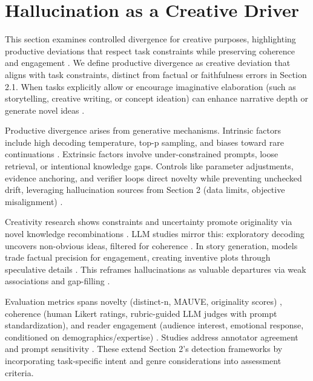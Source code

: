 \documentclass{llncs}
\begin{document}
\section{Hallucination as a Creative Driver}

This section examines controlled divergence for creative purposes, highlighting productive deviations that respect task constraints while preserving coherence and engagement \cite{wu2024writingbench,sun2024hallucinating}.
We define productive divergence as creative deviation that aligns with task constraints, distinct from factual or faithfulness errors in Section 2.1. When tasks explicitly allow or encourage imaginative elaboration (such as storytelling, creative writing, or concept ideation) can enhance narrative depth or generate novel ideas
\cite{tian2025macgyver,zhao2024assessing}.

Productive divergence arises from generative mechanisms. Intrinsic factors include high decoding temperature, top-p sampling, and biases toward rare continuations \cite{kalai2025why,hubert2024current}. Extrinsic factors involve under-constrained prompts, loose retrieval, or intentional knowledge gaps. Controls like parameter adjustments, evidence anchoring, and verifier loops direct novelty while preventing unchecked drift, leveraging hallucination sources from Section 2 (data limits, objective misalignment) \cite{sun2024hallucinating,he2025shakespearean}.

Creativity research shows constraints and uncertainty promote originality via novel knowledge recombinations \cite{acar2019creativity,carlini2024divergent}. LLM studies mirror this: exploratory decoding uncovers non-obvious ideas, filtered for coherence \cite{franceschelli2024creativity,rick2023supermind,tian2025macgyver}. In story generation, models trade factual precision for engagement, creating inventive plots through speculative details \cite{jiang2024survey,patil2024using}. This reframes hallucinations as valuable departures via weak associations and gap-filling \cite{sun2024hallucinating,feng2025generative}.

Evaluation metrics spans novelty (distinct-n, MAUVE, originality scores) \cite{fein2025litbench,ismayilzada2025evaluating,creativebench2024}, coherence (human Likert ratings, rubric-guided LLM judges with prompt standardization), and reader engagement (audience interest, emotional response, conditioned on demographics/expertise) \cite{marco2025reader,li2025automated,jangra2024evaluating}. Studies address annotator agreement and prompt sensitivity \cite{bang2025hallulens,li2024automated}. These extend Section 2's detection frameworks by incorporating task-specific intent and genre considerations into assessment criteria\cite{wang2024benchmarking,chen2024exploring}.
\end{document}
